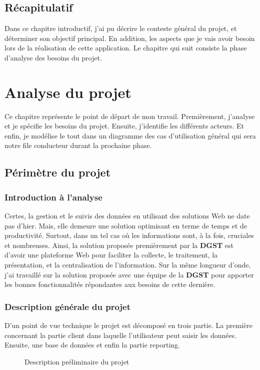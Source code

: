 \documentclass[a4paper]{report}
\begin{document}
\begin{doublespace}
	\section{Récapitulatif}
	Dans ce chapitre introductif, j'ai pu décrire le conteste général du
	projet, et
	déterminer son objectif principal. En addition, les aspects que je vais
	avoir besoin lors de la réalisation de cette application.
	Le chapitre qui suit consiste la phase d'analyse des besoins du projet.
	\newpage
	\chapter{Analyse du projet}
	\fancyhead[L]{\hspace*{5cm}}

	Ce chapitre représente le point de départ de mon travail. Premièrement,
	j'analyse et
	je spécifie les besoins du projet. Ensuite, j'identifie les différents
	acteurs. Et enfin, je
	modélise le tout dans un diagramme des cas d’utilisation général qui
	sera notre file conducteur
	durant la prochaine phase.
	\section{Périmètre du projet}
	\subsection{Introduction à l'analyse}
	Certes, la gestion et le suivis des données en utilisant des solutions
	Web ne date pas d'hier. Mais,
	elle demeure une solution optimisant en terme de temps et de
	productivité. Surtout,
	dans un tel cas où les informations sont, à la fois, cruciales et
	nombreuses. Ainsi, la solution proposée premièrement par la \textbf{DGST} est
	d'avoir une plateforme Web pour faciliter la collecte,
	le traitement, la présentation, et la centralisation de l'information.
	Sur la même longueur d'onde, j'ai
	travaillé sur la solution proposée avec une équipe de la \textbf{DGST}
	pour apporter les bonnes
	fonctionnalités répondantes aux besoins de cette dernière.
	\subsection{Description générale du projet}
	D'un point de vue technique le projet est décomposé en trois partie. La
	première concernant la partie client dans laquelle l'utilisateur peut saisir
	les données. Ensuite, une base de données et enfin la partie reporting.
	\begin{figure}[H]
		\begin{center}
			\caption{Description préliminaire du projet}
		\end{center}
	\end{figure}

\end{doublespace}
\end{document}
